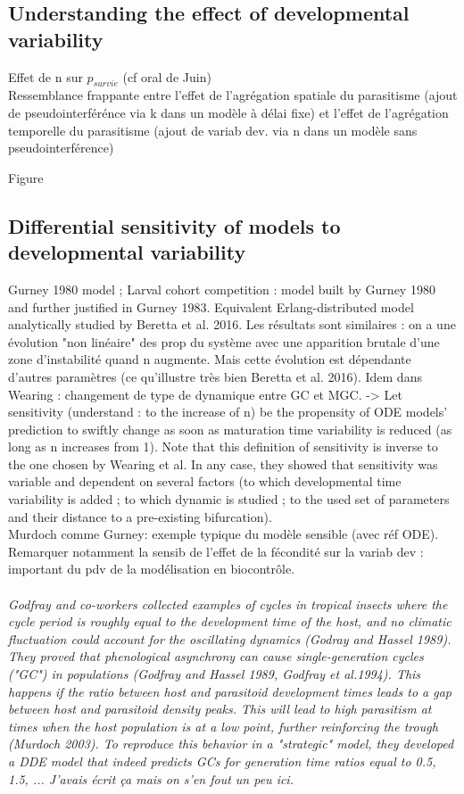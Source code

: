 \documentclass[12pt,a4paper,onecolumn]{article}
\begin{document}
\subsection{Understanding the effect of developmental variability}
Effet de n sur $p_{survie}$ (cf oral de Juin)
\\
Ressemblance frappante entre l'effet de l'agrégation spatiale du parasitisme (ajout de pseudointerférénce via k dans un modèle à délai fixe) et l'effet de l'agrégation temporelle du parasitisme (ajout de variab dev. via n dans un modèle sans pseudointerférence)

Figure

\subsection{Differential sensitivity of models to developmental variability}
Gurney 1980 model ; Larval cohort competition : model built by Gurney 1980 and further justified in Gurney 1983. Equivalent Erlang-distributed model analytically studied by Beretta et al. 2016. Les résultats sont similaires : on a une évolution "non linéaire" des prop du système avec une apparition brutale d'une zone d'instabilité quand n augmente. Mais cette évolution est dépendante d'autres paramètres (ce qu'illustre très bien Beretta et al. 2016). Idem dans Wearing : changement de type de dynamique entre GC et MGC.
\tabto{1.5 cm} -> Let sensitivity (understand : to the increase of n) be the propensity of ODE models’ prediction to swiftly change as soon as maturation time variability is reduced (as long as n increases from 1).  Note that this definition of sensitivity is inverse to the one chosen by Wearing et al. In any case, they showed that sensitivity was variable and dependent on several factors (to which developmental time variability is added ; to which dynamic is studied ; to the used set of parameters and their distance to a pre-existing bifurcation).  
\\
Murdoch comme Gurney: exemple typique du modèle sensible (avec réf ODE). Remarquer notamment la sensib de l'effet de la fécondité sur la variab dev : important du pdv de la modélisation en biocontrôle.
\\
\\
\textit{Godfray and co-workers collected examples of cycles in tropical insects where the cycle period is roughly equal to the development time of the host, and no climatic fluctuation could account for the oscillating dynamics (Godray and Hassel 1989). They proved that phenological asynchrony can cause single-generation cycles ("GC") in populations (Godfray and Hassel 1989, Godfray et al.1994). This happens if the ratio between host and parasitoid development times leads to a gap between host and parasitoid density peaks. This will lead to high parasitism at times when the host population is at a low point, further reinforcing the trough (Murdoch 2003).  To reproduce this behavior in a "strategic" model, they developed a DDE model that indeed predicts GCs for generation time ratios equal to 0.5, 1.5, ... J'avais écrit ça mais on s'en fout un peu ici. } \\
\end{document}
